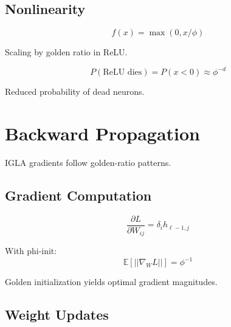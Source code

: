 \subsection{Nonlinearity}

\begin{definition}
\label{def:golden-relu}
\begin{equation}
f(x) = \max(0, x/\phi)
\end{equation}

Scaling by golden ratio in ReLU.
\end{definition}

\begin{proposition}
\label{prop:dead-prevent}
\begin{equation}
P(\text{ReLU dies}) = P(x < 0) \approx \phi^{-d}
\end{equation}

Reduced probability of dead neurons.
\end{proposition}

\section{Backward Propagation}

IGLA gradients follow golden-ratio patterns.

\subsection{Gradient Computation}

\begin{definition}
\label{def:golden-grad}
\begin{equation}
\frac{\partial L}{\partial W_{ij}} = \delta_i h_{\ell-1,j}
\end{equation}
\end{definition}

\begin{theorem}
\label{thm:golden-grad-flow}
With phi-init:
\begin{equation}
\mathbb{E}[||\nabla_W L||] = \phi^{-1}
\end{equation}

Golden initialization yields optimal gradient magnitudes.
\end{theorem}

\subsection{Weight Updates}

